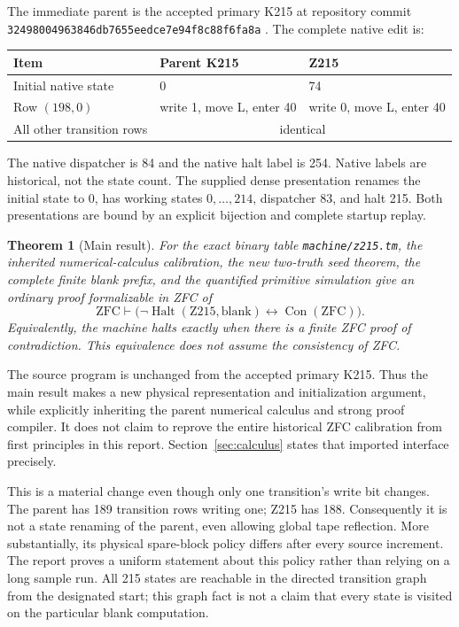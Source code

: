\documentclass[11pt,letterpaper]{article}
\newtheorem{theorem}{Theorem}[section]
\theoremstyle{definition}
\newcommand{\ZFC}{\mathrm{ZFC}}
\newcommand{\Con}{\operatorname{Con}}
\newcommand{\Halt}{\operatorname{Halt}}
\newcommand{\pathfile}[1]{\texttt{\nolinkurl{#1}}}
\begin{document}
The immediate parent is the accepted primary K215 at repository commit
\pathfile{32498004963846db7655eedce7e94f8c88f6fa8a}
\cite{repo,k215}.  The complete native edit is:
\begin{center}
\begin{tabular}{lll}
\toprule
Item & Parent K215 & Z215 \\
\midrule
Initial native state & 0 & 74 \\
Row $(198,0)$ & write 1, move L, enter 40 & write 0, move L, enter 40 \\
All other transition rows & \multicolumn{2}{c}{identical} \\
\bottomrule
\end{tabular}
\end{center}
The native dispatcher is 84 and the native halt label is 254.  Native
labels are historical, not the state count.  The supplied dense
presentation renames the initial state to 0, has working states
$0,\ldots,214$, dispatcher 83, and halt 215.  Both presentations are
bound by an explicit bijection and complete startup replay.

\begin{theorem}[Main result]
\label{thm:main}
For the exact binary table \pathfile{machine/z215.tm}, the inherited
numerical-calculus calibration, the new two-truth seed theorem, the
complete finite blank prefix, and the quantified primitive simulation
give an ordinary proof formalizable in ZFC of
\[
 \ZFC\vdash
 \bigl(\neg\Halt(\mathrm{Z215},\mathrm{blank})
       \longleftrightarrow\Con(\ZFC)\bigr).
\]
Equivalently, the machine halts exactly when there is a finite ZFC proof
of contradiction.  This equivalence does not assume the consistency
of ZFC.
\end{theorem}

The source program is unchanged from the accepted primary K215.  Thus
the main result makes a new physical representation and initialization
argument, while explicitly inheriting the parent numerical calculus and
strong proof compiler.  It does not claim to reprove the entire
historical ZFC calibration from first principles in this report.
Section~\ref{sec:calculus} states that imported interface precisely.

This is a material change even though only one transition's write bit
changes.  The parent has 189 transition rows writing one; Z215 has 188.
Consequently it is not a state renaming of the parent, even allowing
global tape reflection.  More substantially, its physical spare-block
policy differs after every source increment.  The report proves a
uniform statement about this policy rather than relying on a long
sample run.  All 215 states are reachable in the directed transition
graph from the designated start; this graph fact is not a claim that
every state is visited on the particular blank computation.
\end{document}
